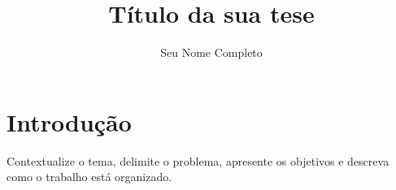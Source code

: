 \documentclass[12pt,a4paper,oneside]{book}
\title{Título da sua tese}
\author{Seu Nome Completo}
\begin{document}
\frontmatter

\maketitle

\folhaaprovacao

\makeabstracts


\tableofcontents

\mainmatter


\chapter{Introdução}\label{cap:introducao}

Contextualize o tema, delimite o problema, apresente os objetivos e
descreva como o trabalho está organizado.
\end{document}
